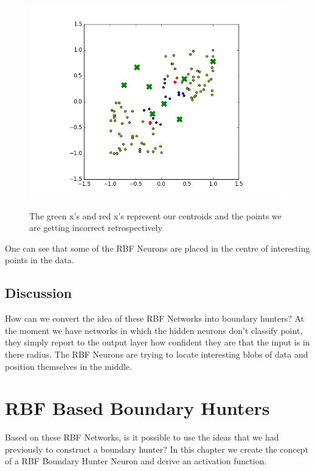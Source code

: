 \documentclass[notitlepage]{report}
\theoremstyle{definition}
\begin{document}
\begin{figure}[H]
\begin{minipage}[b]{0.4\textwidth}
    \includegraphics[width=\textwidth]{RBFN-03.png}
    \caption{}
  \end{minipage}
  \hfill

The green x's and red x's represent our centroids and the points we are getting incorrect retrospectively
\end{figure}

One can see that some of the RBF Neurons are placed in the centre of interesting points in the data.

\section{Discussion}
How can we convert the idea of these RBF Networks into boundary hunters? At the moment we have networks in which the hidden neurons don't classify point, they simply report to the output layer how confident they are that the input is in there radius. The RBF Neurons are trying to locate interesting blobs of data and position themselves in the middle.

\chapter{RBF Based Boundary Hunters}
Based on these RBF Networks, is it possible to use the ideas that we had previously to construct a boundary hunter? In this chapter we create the concept of a RBF Boundary Hunter Neuron and derive an activation function.\\
\end{document}
